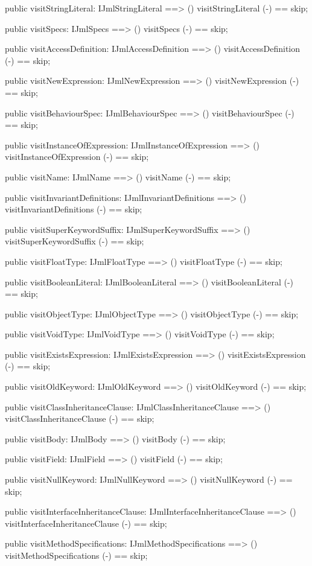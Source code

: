 \begin{vdm_al}
  public visitStringLiteral: IJmlStringLiteral ==> ()
  visitStringLiteral (-) == skip;

  public visitSpecs: IJmlSpecs ==> ()
  visitSpecs (-) == skip;

  public visitAccessDefinition: IJmlAccessDefinition ==> ()
  visitAccessDefinition (-) == skip;

  public visitNewExpression: IJmlNewExpression ==> ()
  visitNewExpression (-) == skip;

  public visitBehaviourSpec: IJmlBehaviourSpec ==> ()
  visitBehaviourSpec (-) == skip;

  public visitInstanceOfExpression: IJmlInstanceOfExpression ==> ()
  visitInstanceOfExpression (-) == skip;

  public visitName: IJmlName ==> ()
  visitName (-) == skip;

  public visitInvariantDefinitions: IJmlInvariantDefinitions ==> ()
  visitInvariantDefinitions (-) == skip;

  public visitSuperKeywordSuffix: IJmlSuperKeywordSuffix ==> ()
  visitSuperKeywordSuffix (-) == skip;

  public visitFloatType: IJmlFloatType ==> ()
  visitFloatType (-) == skip;

  public visitBooleanLiteral: IJmlBooleanLiteral ==> ()
  visitBooleanLiteral (-) == skip;

  public visitObjectType: IJmlObjectType ==> ()
  visitObjectType (-) == skip;

  public visitVoidType: IJmlVoidType ==> ()
  visitVoidType (-) == skip;

  public visitExistsExpression: IJmlExistsExpression ==> ()
  visitExistsExpression (-) == skip;

  public visitOldKeyword: IJmlOldKeyword ==> ()
  visitOldKeyword (-) == skip;

  public visitClassInheritanceClause: IJmlClassInheritanceClause ==> ()
  visitClassInheritanceClause (-) == skip;

  public visitBody: IJmlBody ==> ()
  visitBody (-) == skip;

  public visitField: IJmlField ==> ()
  visitField (-) == skip;

  public visitNullKeyword: IJmlNullKeyword ==> ()
  visitNullKeyword (-) == skip;

  public visitInterfaceInheritanceClause: IJmlInterfaceInheritanceClause ==> ()
  visitInterfaceInheritanceClause (-) == skip;

  public visitMethodSpecifications: IJmlMethodSpecifications ==> ()
  visitMethodSpecifications (-) == skip;


\end{vdm_al}
